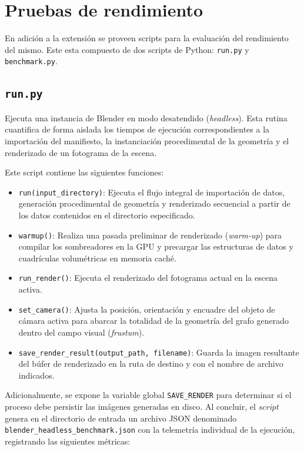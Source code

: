 \section{Pruebas de rendimiento}
En adición a la extensión se proveen scripts para la evaluación del rendimiento del mismo. Este esta compuesto de dos scripts de Python:
\texttt{run.py} y \texttt{benchmark.py}.

\subsection{\texttt{run.py}}
Ejecuta una instancia de Blender en modo desatendido (\textit{headless}). Esta rutina cuantifica de forma aislada 
los tiempos de ejecución correspondientes a la importación del manifiesto, la instanciación procedimental de la 
geometría y el renderizado de un fotograma de la escena.
\medskip

Este script contiene las siguientes funciones:
\begin{itemize}
    \item \texttt{run(input\_directory)}: Ejecuta el flujo integral de importación de datos, generación procedimental de geometría y 
    renderizado secuencial a partir de los datos contenidos en el directorio especificado.
    \item \texttt{warmup()}: Realiza una pasada preliminar de renderizado (\textit{warm-up}) para compilar los sombreadores en la GPU 
    y precargar las estructuras de datos y cuadrículas volumétricas en memoria caché.
    \item \texttt{run\_render()}: Ejecuta el renderizado del fotograma actual en la escena activa.
    \item \texttt{set\_camera()}: Ajusta la posición, orientación y encuadre del objeto de cámara activa para abarcar la totalidad de 
    la geometría del grafo generado dentro del campo visual (\textit{frustum}).
    \item \texttt{save\_render\_result(output\_path, filename)}: Guarda la imagen resultante del búfer de renderizado en la ruta de 
    destino y con el nombre de archivo indicados.
\end{itemize}

Adicionalmente, se expone la variable global \texttt{SAVE\_RENDER} para determinar si el proceso debe persistir las imágenes generadas 
en disco. Al concluir, el \textit{script} genera en el directorio de entrada un archivo JSON denominado 
\texttt{blender\_headless\_benchmark.json} con la telemetría individual de la ejecución, registrando las siguientes métricas:


